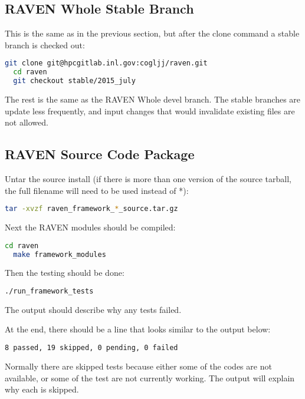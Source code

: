 \subsection{RAVEN Whole Stable Branch}

This is the same as in the previous section, but after the clone
command a stable branch is checked out:

\begin{lstlisting}[language=bash]
  git clone git@hpcgitlab.inl.gov:cogljj/raven.git
  cd raven
  git checkout stable/2015_july
\end{lstlisting}

The rest is the same as the RAVEN Whole devel branch.  The stable
branches are update less frequently, and input changes that would
invalidate existing files are not allowed.

\subsection{RAVEN Source Code Package}

Untar the source install (if there is more than one version of the
source tarball, the full filename will need to be used instead of *):

\begin{lstlisting}[language=bash]
tar -xvzf raven_framework_*_source.tar.gz
\end{lstlisting}

Next the RAVEN modules should be compiled:

\begin{lstlisting}[language=bash]
  cd raven
  make framework_modules
\end{lstlisting}

Then the testing should be done:

\begin{lstlisting}[language=bash]
  ./run_framework_tests
\end{lstlisting}

The output should describe why any tests failed.

At the end, there should be a line that looks similar to the output below:
\begin{lstlisting}[language=bash]
8 passed, 19 skipped, 0 pending, 0 failed
\end{lstlisting}

Normally there are skipped tests because either some of the codes are
not available, or some of the test are not currently working.  The
output will explain why each is skipped.


